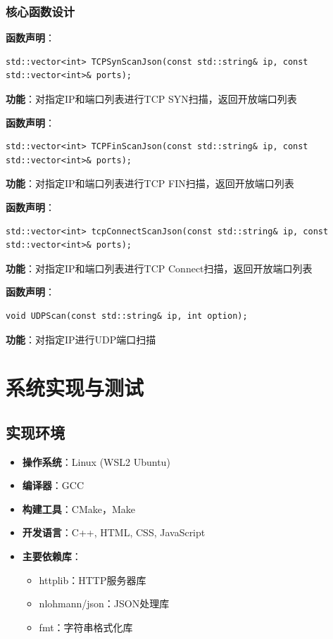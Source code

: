 \documentclass[12pt,hyperref,a4paper,UTF8]{ctexart}
\begin{document}
\subsubsection{核心函数设计}

\textbf{函数声明}：
\begin{verbatim}
std::vector<int> TCPSynScanJson(const std::string& ip, const std::vector<int>& ports);
\end{verbatim}
\textbf{功能}：对指定IP和端口列表进行TCP SYN扫描，返回开放端口列表

\textbf{函数声明}：
\begin{verbatim}
std::vector<int> TCPFinScanJson(const std::string& ip, const std::vector<int>& ports);
\end{verbatim}
\textbf{功能}：对指定IP和端口列表进行TCP FIN扫描，返回开放端口列表

\textbf{函数声明}：
\begin{verbatim}
std::vector<int> tcpConnectScanJson(const std::string& ip, const std::vector<int>& ports);
\end{verbatim}
\textbf{功能}：对指定IP和端口列表进行TCP Connect扫描，返回开放端口列表

\textbf{函数声明}：
\begin{verbatim}
void UDPScan(const std::string& ip, int option);
\end{verbatim}
\textbf{功能}：对指定IP进行UDP端口扫描

\section{系统实现与测试}

\subsection{实现环境}
\begin{itemize}
    \item \textbf{操作系统}：Linux (WSL2 Ubuntu)
    \item \textbf{编译器}：GCC
    \item \textbf{构建工具}：CMake，Make
    \item \textbf{开发语言}：C++, HTML, CSS, JavaScript
    \item \textbf{主要依赖库}：
    \begin{itemize}
        \item httplib：HTTP服务器库
        \item nlohmann/json：JSON处理库
        \item fmt：字符串格式化库
    \end{itemize}
\end{itemize}
\end{document}
